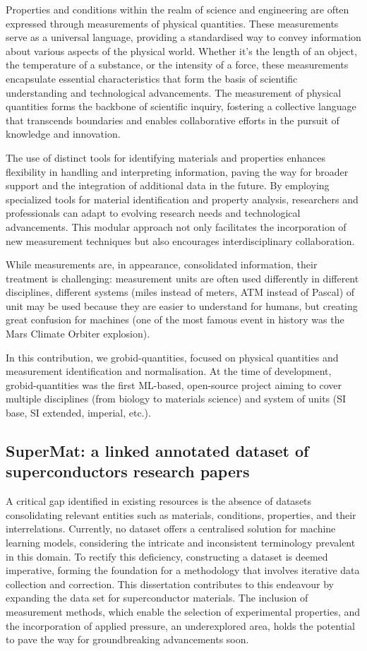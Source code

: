Properties and conditions within the realm of science and engineering are often expressed through measurements of physical quantities. These measurements serve as a universal language, providing a standardised way to convey information about various aspects of the physical world. Whether it's the length of an object, the temperature of a substance, or the intensity of a force, these measurements encapsulate essential characteristics that form the basis of scientific understanding and technological advancements.
The measurement of physical quantities forms the backbone of scientific inquiry, fostering a collective language that transcends boundaries and enables collaborative efforts in the pursuit of knowledge and innovation.

The use of distinct tools for identifying materials and properties enhances flexibility in handling and interpreting information, paving the way for broader support and the integration of additional data in the future. By employing specialized tools for material identification and property analysis, researchers and professionals can adapt to evolving research needs and technological advancements. This modular approach not only facilitates the incorporation of new measurement techniques but also encourages interdisciplinary collaboration.

While measurements are, in appearance, consolidated information, their treatment is challenging: measurement units are often used differently in different disciplines, different systems (miles instead of meters, ATM instead of Pascal) of unit may be used because they are easier to understand for humans, but creating great confusion for machines (one of the most famous event in history was the Mars Climate Orbiter explosion). 

In this contribution, we grobid-quantities, focused on physical quantities and measurement identification and normalisation. At the time of development, grobid-quantities was the first ML-based, open-source project aiming to cover multiple disciplines (from biology to materials science) and system of units (SI base, SI extended, imperial, etc.). 


\subsection{SuperMat: a linked annotated dataset of superconductors research papers}
A critical gap identified in existing resources is the absence of datasets consolidating relevant entities such as materials, conditions, properties, and their interrelations. 
Currently, no dataset offers a centralised solution for machine learning models, considering the intricate and inconsistent terminology prevalent in this domain. 
To rectify this deficiency, constructing a dataset is deemed imperative, forming the foundation for a methodology that involves iterative data collection and correction. This dissertation contributes to this endeavour by expanding the data set for superconductor materials. 
The inclusion of measurement methods, which enable the selection of experimental properties, and the incorporation of applied pressure, an underexplored area, holds the potential to pave the way for groundbreaking advancements soon.


